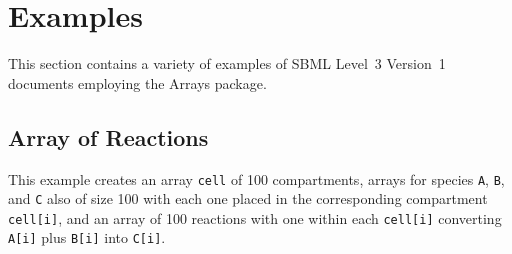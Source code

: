 
\section{Examples}
\label{examples}

This section contains a variety of examples of SBML Level~3 Version~1
documents employing the Arrays package.

\subsection{Array of Reactions}

This example creates an array {\tt cell} of 100 compartments, arrays for species {\tt A}, {\tt B}, and {\tt C} also of size 100 with each one placed in the corresponding compartment {\tt cell[i]}, and an array of 100 reactions with one within each {\tt cell[i]} converting {\tt A[i]} plus {\tt B[i]} into {\tt C[i]}.


